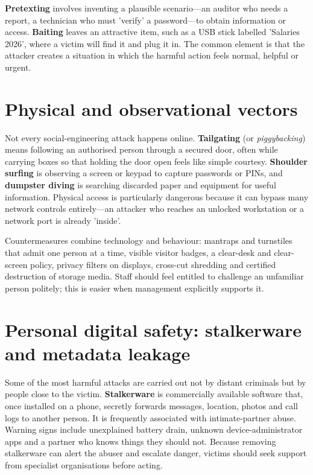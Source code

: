 \documentclass[11pt,openany]{book}
\begin{document}
\textbf{Pretexting} involves inventing a plausible scenario—an auditor who needs a report, a technician who must 'verify' a password—to obtain information or access. \textbf{Baiting} leaves an attractive item, such as a USB stick labelled 'Salaries 2026', where a victim will find it and plug it in. The common element is that the attacker creates a situation in which the harmful action feels normal, helpful or urgent.

\section{Physical and observational vectors}\label{sec:5.3}
Not every social-engineering attack happens online. \textbf{Tailgating} (or \emph{piggybacking}) means following an authorised person through a secured door, often while carrying boxes so that holding the door open feels like simple courtesy. \textbf{Shoulder surfing} is observing a screen or keypad to capture passwords or PINs, and \textbf{dumpster diving} is searching discarded paper and equipment for useful information. Physical access is particularly dangerous because it can bypass many network controls entirely—an attacker who reaches an unlocked workstation or a network port is already 'inside'.

Countermeasures combine technology and behaviour: mantraps and turnstiles that admit one person at a time, visible visitor badges, a clear-desk and clear-screen policy, privacy filters on displays, cross-cut shredding and certified destruction of storage media. Staff should feel entitled to challenge an unfamiliar person politely; this is easier when management explicitly supports it.

\section{Personal digital safety: stalkerware and metadata leakage}\label{sec:5.4}
Some of the most harmful attacks are carried out not by distant criminals but by people close to the victim. \textbf{Stalkerware} is commercially available software that, once installed on a phone, secretly forwards messages, location, photos and call logs to another person. It is frequently associated with intimate-partner abuse. Warning signs include unexplained battery drain, unknown device-administrator apps and a partner who knows things they should not. Because removing stalkerware can alert the abuser and escalate danger, victims should seek support from specialist organisations before acting.
\end{document}
